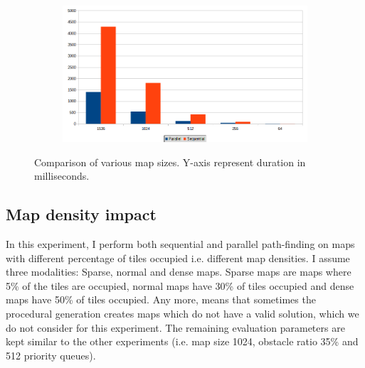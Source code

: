 \documentclass{article}
\begin{document}
%
\begin{figure}[h]
    \centering
    \begin{subfigure}[b]{1.0\textwidth}
        \centering
        \includegraphics[width=\textwidth]{figures/grid_size.png}
    \end{subfigure}
    \hfill
    \caption{Comparison of various map sizes. Y-axis represent duration in milliseconds. }
    \label{fig:map_size}
\end{figure}
%
\subsection{Map density impact}
%
In this experiment, I perform both sequential and parallel path-finding on maps with different percentage of tiles occupied i.e. different map densities. I assume three modalities: Sparse, normal and dense maps. Sparse maps are maps where 5\% of the tiles are occupied, normal maps have 30\% of tiles occupied and dense maps have 50\% of tiles occupied. Any more, means that sometimes the procedural generation creates maps which do not have a valid solution, which we do not consider for this experiment. The remaining evaluation parameters are kept similar to the other experiments (i.e. map size 1024, obstacle ratio 35\% and 512 priority queues).
\end{document}
